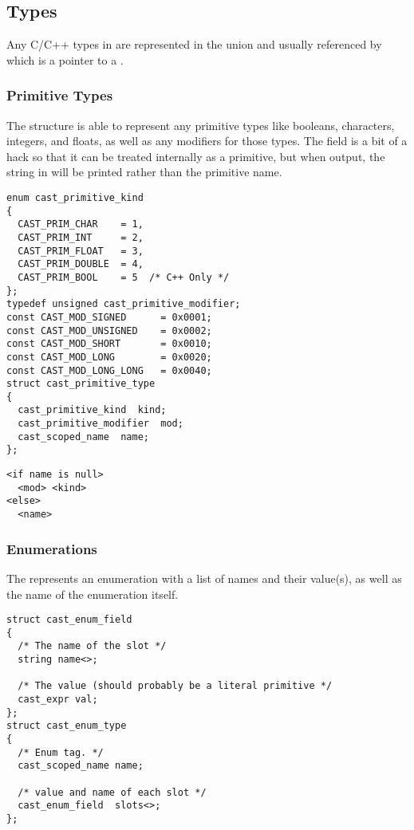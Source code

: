 

\subsection{Types}
\label{subsec:CAST:Types}

Any C/C++ types in \CAST{} are represented in the  union and
usually referenced by  which is a pointer to a
.

\subsubsection{Primitive Types}

The  structure is able to represent any primitive
types like booleans, characters, integers, and floats, as well as any modifiers
for those types.  The  field is a bit of a hack so that it
can be treated internally as a primitive, but when output, the string in
 will be printed rather than the primitive name.

\begin{verbatim}
enum cast_primitive_kind
{
  CAST_PRIM_CHAR    = 1,
  CAST_PRIM_INT     = 2,
  CAST_PRIM_FLOAT   = 3,
  CAST_PRIM_DOUBLE  = 4,
  CAST_PRIM_BOOL    = 5  /* C++ Only */
};
typedef unsigned cast_primitive_modifier;
const CAST_MOD_SIGNED      = 0x0001;
const CAST_MOD_UNSIGNED    = 0x0002;
const CAST_MOD_SHORT       = 0x0010;
const CAST_MOD_LONG        = 0x0020;
const CAST_MOD_LONG_LONG   = 0x0040;
struct cast_primitive_type
{
  cast_primitive_kind  kind;
  cast_primitive_modifier  mod;
  cast_scoped_name  name;
};
\end{verbatim}

\begin{verbatim}
<if name is null>
  <mod> <kind>
<else>
  <name>
\end{verbatim}

\subsubsection{Enumerations}

The  represents an enumeration with a list of names
and their value(s), as well as the name of the enumeration itself.

\begin{verbatim}
struct cast_enum_field
{
  /* The name of the slot */
  string name<>;

  /* The value (should probably be a literal primitive */
  cast_expr val;
};
struct cast_enum_type
{
  /* Enum tag. */
  cast_scoped_name name;

  /* value and name of each slot */
  cast_enum_field  slots<>;
};
\end{verbatim}

